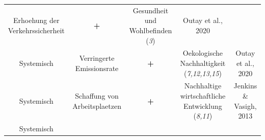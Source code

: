 \documentclass[
]{book}
\begin{document}
\begin{longtable}[]{@{}ccccc@{}}
\begin{minipage}[t]{0.16\columnwidth}
Erhoehung der Verkehrssicherheit\strut
\end{minipage} & \begin{minipage}[t]{0.17\columnwidth}\centering
\textbf{+}\strut
\end{minipage} & \begin{minipage}[t]{0.17\columnwidth}\centering
Gesundheit und Wohlbefinden (\emph{3})\strut
\end{minipage} & \begin{minipage}[t]{0.17\columnwidth}\centering
Outay et al., 2020\strut
\end{minipage}\tabularnewline
\begin{minipage}[t]{0.17\columnwidth}\centering
Systemisch\strut
\end{minipage} & \begin{minipage}[t]{0.16\columnwidth}\centering
Verringerte Emissionsrate\strut
\end{minipage} & \begin{minipage}[t]{0.17\columnwidth}\centering
\textbf{+}\strut
\end{minipage} & \begin{minipage}[t]{0.17\columnwidth}\centering
Oekologische Nachhaltigkeit (\emph{7,12,13,15})\strut
\end{minipage} & \begin{minipage}[t]{0.17\columnwidth}\centering
Outay et al., 2020\strut
\end{minipage}\tabularnewline
\begin{minipage}[t]{0.17\columnwidth}\centering
Systemisch\strut
\end{minipage} & \begin{minipage}[t]{0.16\columnwidth}\centering
Schaffung von Arbeitsplaetzen\strut
\end{minipage} & \begin{minipage}[t]{0.17\columnwidth}\centering
\textbf{+}\strut
\end{minipage} & \begin{minipage}[t]{0.17\columnwidth}\centering
Nachhaltige wirtschaftliche Entwicklung (\emph{8,11})\strut
\end{minipage} & \begin{minipage}[t]{0.17\columnwidth}\centering
Jenkins \& Vasigh, 2013\strut
\end{minipage}\tabularnewline
\begin{minipage}[t]{0.17\columnwidth}\centering
Systemisch\strut
\end{minipage} & \begin{minipage}[t]{0.16\columnwidth}\centering

\end{minipage}
\end{longtable}
\end{document}

